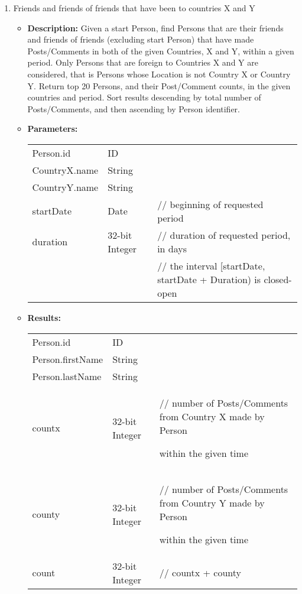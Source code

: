 {\begin{enumerate}
	\item Friends and friends of friends that have been to countries X and Y
	\begin{itemize}
		\item \textbf{Description:}
            Given a start Person, find Persons that are their friends and
            friends of friends (excluding start Person) that have made
            Posts/Comments in both of the given Countries, X and Y, within a
            given period.  Only Persons that are foreign to Countries X and Y
            are considered, that is Persons whose Location is not Country X or
            Country Y.  Return top 20 Persons, and their Post/Comment counts,
            in the given countries and period.  Sort results descending by
            total number of Posts/Comments, and then ascending by Person
            identifier.
		\item \textbf{Parameters:} \\
			\begin{tabular}{lll}
				Person.id 										& ID & \\
				CountryX.name									& String & \\
				CountryY.name									& String & \\
				startDate										& Date 	& // beginning of requested period \\
				duration										& 32-bit Integer 					& // duration of requested period, in days \\
                                                                &                                   & // the interval [startDate, startDate + Duration) is closed-open\\
			\end{tabular}		
		\item \textbf{Results:} \\
			\begin{tabular}{lll}
				Person.id 										& ID 	& \\
				Person.firstName 								& String 			& \\
				Person.lastName 								& String 			& \\
				countx 											& 32-bit Integer 	& \parbox[t]{20cm}{// number of Posts/Comments from Country X made by Person \par 
																					within the given time\strut} \\
				county 											& 32-bit Integer 	& \parbox[t]{20cm}{// number of Posts/Comments from Country Y made by Person \par 
																					within the given time\strut} \\
				count 											& 32-bit Integer 	& // countx + county \\
			\end{tabular}		
	\end{itemize}
		

\end{enumerate}}
